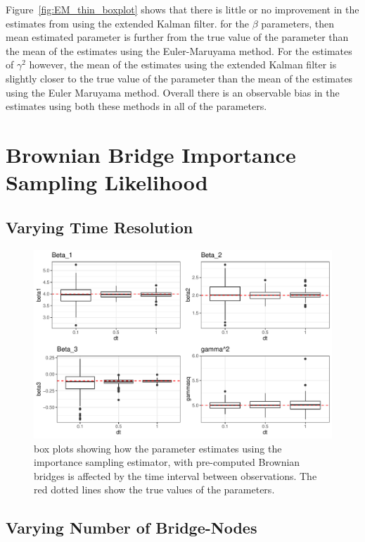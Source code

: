 Figure~\ref{fig:EM_thin_boxplot} shows that there is little or no improvement in the estimates from using the extended Kalman filter. for the $\beta$ parameters, then mean estimated parameter is further from the true value of the parameter than the mean of the estimates using the Euler-Maruyama method. For the estimates of $\gamma^2$ however, the mean of the estimates using the extended Kalman filter is slightly closer to the true value of the parameter than the mean of the estimates using the Euler Maruyama method. Overall there is an observable bias in the estimates using both these methods in all of the parameters.

\section{Brownian Bridge Importance Sampling Likelihood}

\subsection{Varying Time Resolution}


\begin{figure}[H]
    \centering
    \includegraphics[width=\linewidth]{Images/Results/varying dt plot brownian bridge likelihood.pdf}
    \caption[Box plots of Parameter Estimates for various observation intervals]{box plots showing how the parameter estimates using the importance sampling estimator, with pre-computed Brownian bridges is affected by the time interval between observations. The red dotted lines show the true values of the parameters.}
    \label{fig:}
\end{figure}


\subsection{Varying Number of Bridge-Nodes}



